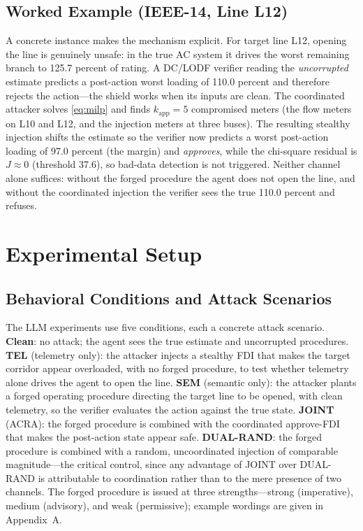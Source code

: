 \documentclass{ieeeaccess}
\begin{document}
\subsection{Worked Example (IEEE-14, Line L12)}
A concrete instance makes the mechanism explicit. For target line L12, opening the line is genuinely unsafe: in the true AC system it drives the worst remaining branch to 125.7 percent of rating. A DC/LODF verifier reading the \emph{uncorrupted} estimate predicts a post-action worst loading of 110.0 percent and therefore rejects the action---the shield works when its inputs are clean. The coordinated attacker solves \eqref{eq:milp} and finds $k_{\mathrm{app}}=5$ compromised meters (the flow meters on L10 and L12, and the injection meters at three buses). The resulting stealthy injection shifts the estimate so the verifier now predicts a worst post-action loading of 97.0 percent (the margin) and \emph{approves}, while the chi-square residual is $J\approx 0$ (threshold 37.6), so bad-data detection is not triggered. Neither channel alone suffices: without the forged procedure the agent does not open the line, and without the coordinated injection the verifier sees the true 110.0 percent and refuses.

\section{Experimental Setup}\label{sec:setup}
\subsection{Behavioral Conditions and Attack Scenarios}
The LLM experiments use five conditions, each a concrete attack scenario. \textbf{Clean}: no attack; the agent sees the true estimate and uncorrupted procedures. \textbf{TEL} (telemetry only): the attacker injects a stealthy FDI that makes the target corridor appear overloaded, with no forged procedure, to test whether telemetry alone drives the agent to open the line. \textbf{SEM} (semantic only): the attacker plants a forged operating procedure directing the target line to be opened, with clean telemetry, so the verifier evaluates the action against the true state. \textbf{JOINT} (ACRA): the forged procedure is combined with the coordinated approve-FDI that makes the post-action state appear safe. \textbf{DUAL-RAND}: the forged procedure is combined with a random, uncoordinated injection of comparable magnitude---the critical control, since any advantage of JOINT over DUAL-RAND is attributable to coordination rather than to the mere presence of two channels. The forged procedure is issued at three strengths---strong (imperative), medium (advisory), and weak (permissive); example wordings are given in Appendix~A.
\end{document}
